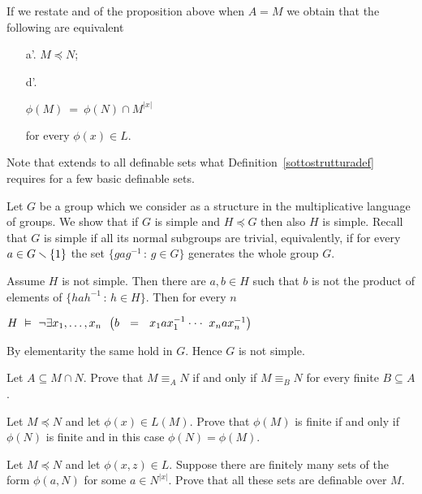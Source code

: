 If we restate  and  of the proposition above when $A=M$ we obtain that the following are equivalent
\begin{itemize}
\item[a'.] $M\preceq N$;
\item[d'.] \parbox{26ex}{$\phi(M)\ =\ \phi(N) \cap M^{|x|}$} for every $\phi(x)\in L$.
\end{itemize}
Note that  extends to all definable sets what Definition~\ref{sottostrutturadef} requires for a few basic definable sets.

\begin{example}
Let $G$ be a group which we consider as a structure in the multiplicative language of groups.
We show that if $G$ is simple and $H\preceq G$ then also $H$ is simple.
Recall that $G$ is simple if all its normal subgroups are trivial, equivalently, if for every $a\in G\smallsetminus \{1\}$ the set $\big\{gag^{-1}\,:\,g\in G\big\}$ generates the whole group $G$.


Assume $H$ is not simple.
Then there are $a,b\in H$ such that $b$ is not the product of elements of $\big\{hah^{-1}\,:\,h\in H\big\}$.
Then for every $n$ 

\hfil$H\ \models\ \neg\E x_1,\dots,x_n\ \ \big(b\ \ =\ \ x_1ax_1^{-1}\cdot\cdot\cdot\ x_nax_n^{-1}\big)$

By elementarity the same hold in $G$.
Hence $G$ is not simple.
\end{example}


\begin{exercise}\label{ex_finitanaturaeqel}
Let $A\subseteq M\cap N$.
Prove that $M\equiv_A N$ if and only if $M\equiv_B N$ for every finite $B\subseteq A$.
\end{exercise}

\begin{exercise}\label{ex_finite_elemenrary}
Let $M\preceq N$ and let $\phi(x)\in L(M)$.
Prove that $\phi(M)$ is finite if and only if $\phi(N)$ is finite and in this case $\phi(N)=\phi(M)$.
\end{exercise}

\begin{exercise}\label{ex_finite_fam_sets}
Let $M\preceq N$ and let $\phi(x,z)\in L$.
Suppose there are finitely many sets of the form $\phi(a,N)$ for some $a\in N^{|x|}$.
Prove that all these sets are definable over $M$.
\end{exercise}

